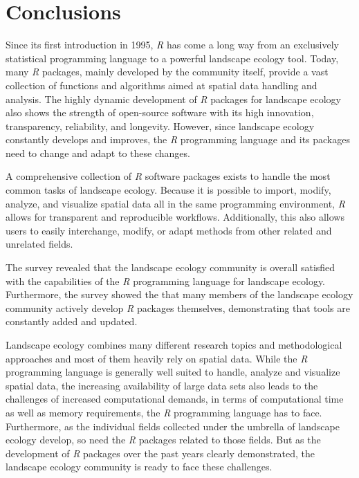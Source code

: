 \documentclass[smallextended]{svjour3}       %
\begin{document}
\hypertarget{conclusions}{%
\section{Conclusions}\label{conclusions}}

Since its first introduction in 1995, \emph{R} has come a long way from an exclusively statistical programming language to a powerful landscape ecology tool.
Today, many \emph{R} packages, mainly developed by the community itself, provide a vast collection of functions and algorithms aimed at spatial data handling and analysis.
The highly dynamic development of \emph{R} packages for landscape ecology also shows the strength of open-source software with its high innovation, transparency, reliability, and longevity.
However, since landscape ecology constantly develops and improves, the \emph{R} programming language and its packages need to change and adapt to these changes.

A comprehensive collection of \emph{R} software packages exists to handle the most common tasks of landscape ecology.
Because it is possible to import, modify, analyze, and visualize spatial data all in the same programming environment, \emph{R} allows for transparent and reproducible workflows.
Additionally, this also allows users to easily interchange, modify, or adapt methods from other related and unrelated fields.

The survey revealed that the landscape ecology community is overall satisfied with the capabilities of the \emph{R} programming language for landscape ecology.
Furthermore, the survey showed the that many members of the landscape ecology community actively develop \emph{R} packages themselves, demonstrating that tools are constantly added and updated.

Landscape ecology combines many different research topics and methodological approaches and most of them heavily rely on spatial data.
While the \emph{R} programming language is generally well suited to handle, analyze and visualize spatial data, the increasing availability of large data sets also leads to the challenges of increased computational demands, in terms of computational time as well as memory requirements, the \emph{R} programming language has to face.
Furthermore, as the individual fields collected under the umbrella of landscape ecology develop, so need the \emph{R} packages related to those fields.
But as the development of \emph{R} packages over the past years clearly demonstrated, the landscape ecology community is ready to face these challenges.
\end{document}
